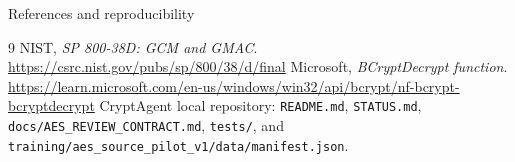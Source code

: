 \documentclass[aspectratio=169,10pt]{beamer}
\begin{document}
\begin{frame}{References and reproducibility}
\scriptsize
\begin{thebibliography}{9}
 NIST, \emph{SP 800-38D: GCM and GMAC}. \url{https://csrc.nist.gov/pubs/sp/800/38/d/final}
 Microsoft, \emph{BCryptDecrypt function}. \url{https://learn.microsoft.com/en-us/windows/win32/api/bcrypt/nf-bcrypt-bcryptdecrypt}
 CryptAgent local repository: \texttt{README.md}, \texttt{STATUS.md}, \texttt{docs/AES\_REVIEW\_CONTRACT.md}, \texttt{tests/}, and \texttt{training/aes\_source\_pilot\_v1/data/manifest.json}.
\end{thebibliography}
\end{frame}
\end{document}
